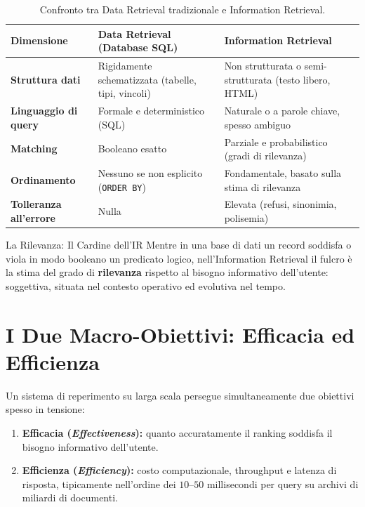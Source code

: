 \begin{table}[H]
\centering
\small
\begin{tabularx}{\textwidth}{>{\raggedright\bfseries\arraybackslash}p{3.6cm} >{\raggedright\arraybackslash}X >{\raggedright\arraybackslash}X}
\toprule
\normalfont\textbf{Dimensione} & \textbf{Data Retrieval (Database SQL)} & \textbf{Information Retrieval} \\
\midrule
Struttura dati & Rigidamente schematizzata (tabelle, tipi, vincoli) & Non strutturata o semi-strutturata (testo libero, HTML) \\
Linguaggio di query & Formale e deterministico (SQL) & Naturale o a parole chiave, spesso ambiguo \\
Matching & Booleano esatto & Parziale e probabilistico (gradi di rilevanza) \\
Ordinamento & Nessuno se non esplicito (\texttt{ORDER BY}) & Fondamentale, basato sulla stima di rilevanza \\
Tolleranza all'errore & Nulla & Elevata (refusi, sinonimia, polisemia) \\
\bottomrule
\end{tabularx}
\caption{Confronto tra Data Retrieval tradizionale e Information Retrieval.}
\label{tab:ir-vs-dr}
\end{table}

\begin{alertblock}{La Rilevanza: Il Cardine dell'IR}
Mentre in una base di dati un record soddisfa o viola in modo booleano un predicato logico, nell'Information Retrieval il fulcro \`e la stima del grado di \textbf{rilevanza} rispetto al bisogno informativo dell'utente: soggettiva, situata nel contesto operativo ed evolutiva nel tempo.
\end{alertblock}

\FloatBarrier
\section{I Due Macro-Obiettivi: Efficacia ed Efficienza}
\label{sec:obiettivi-efficacia-efficienza}

Un sistema di reperimento su larga scala persegue simultaneamente due obiettivi spesso in tensione:
\begin{enumerate}
    \item \textbf{Efficacia (\textit{Effectiveness}):} quanto accuratamente il ranking soddisfa il bisogno informativo dell'utente.
    \item \textbf{Efficienza (\textit{Efficiency}):} costo computazionale, throughput e latenza di risposta, tipicamente nell'ordine dei $10$--$50$ millisecondi per query su archivi di miliardi di documenti.
\end{enumerate}

